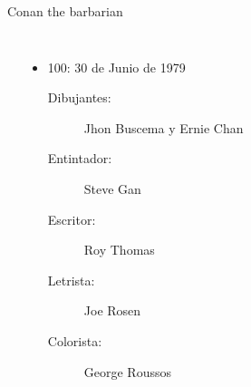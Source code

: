 \begin{frame}{Conan the barbarian}
\begin{columns}
\begin{itemize}
\begin{description}
			\end{description}
		\end{itemize}
		\begin{itemize}
			\item 100: 30 de Junio de 1979
			\begin{description}
				\item[Dibujantes:] Jhon Buscema y Ernie Chan
				\item[Entintador:] Steve Gan
				\item[Escritor:] Roy Thomas
				\item[Letrista:] Joe Rosen
				\item[Colorista:] George Roussos
			\end{description}
		\end{itemize}
	\end{columns}
\end{frame}
\note[itemize]{
	\item
}


